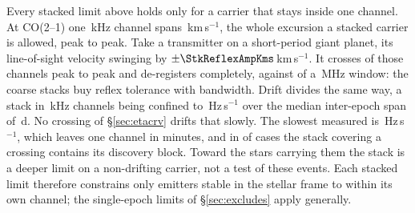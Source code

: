 Every stacked limit above holds only for a carrier that stays inside one
channel. At CO(2--1) one \StkRefChanKHz\,kHz channel spans
\StkTolFineKms\,km\,s$^{-1}$, the whole excursion a stacked carrier is
allowed, peak to peak. Take a transmitter on a short-period giant planet, its line-of-sight
velocity swinging by $\pm\StkReflexAmpKms$\,km\,s$^{-1}$. It crosses
\SzReflexPPChanFine{} of those channels peak to peak and de-registers
completely, against \SzReflexPPChanCoarse{} of a \ChanBModeMHz\,MHz window:
the coarse stacks buy reflex tolerance with bandwidth. Drift divides the same way, a
stack in \StkRefChanKHz\,kHz channels being confined to
\StkDriftTolHzS\,Hz\,s$^{-1}$ over the median inter-epoch span of
\StkSpanMedD\,d. No crossing of \S\ref{sec:etacrv} drifts that slowly. The slowest measured
is \SttDriftMinHzS\,Hz\,s$^{-1}$, which leaves one channel in
\SttDriftMinMin{} minutes, and in \SttNIncDisc{} of \NUnattributed{} cases
the stack covering a crossing contains its discovery block. Toward the
\SttNHostStar{} stars carrying them the stack is a deeper limit on a
non-drifting carrier, not a test of these events. Each
stacked limit therefore constrains only emitters stable in the stellar frame to
within its own channel; the single-epoch limits of \S\ref{sec:excludes} apply
generally.
